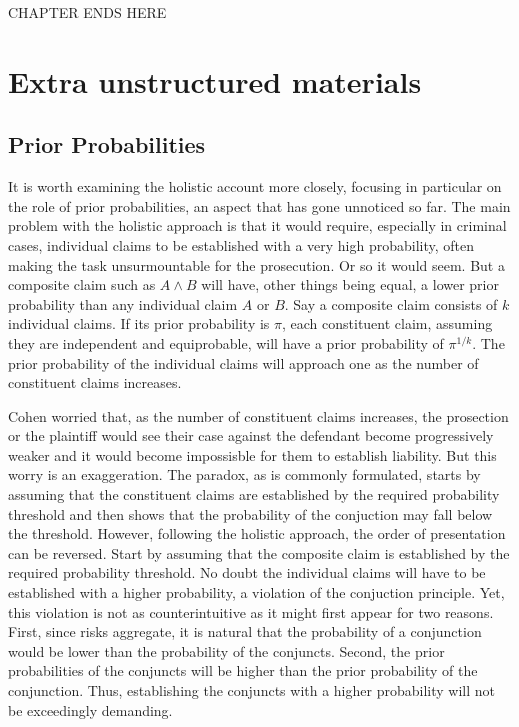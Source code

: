 \documentclass[
  10pt,
  dvipsnames,enabledeprecatedfontcommands]{scrartcl}
\begin{document}
CHAPTER ENDS HERE

\noindent\makebox[\linewidth]{\rule{\paperwidth}{1pt}}

\hypertarget{extra-unstructured-materials}{%
\section{Extra unstructured
materials}\label{extra-unstructured-materials}}

\hypertarget{prior-probabilities}{%
\subsection{Prior Probabilities}\label{prior-probabilities}}

It is worth examining the holistic account more closely, focusing in
particular on the role of prior probabilities, an aspect that has gone
unnoticed so far. The main problem with the holistic approach is that it
would require, especially in criminal cases, individual claims to be
established with a very high probability, often making the task
unsurmountable for the prosecution. Or so it would seem. But a composite
claim such as \(A\wedge B\) will have, other things being equal, a lower
prior probability than any individual claim \(A\) or \(B\). Say a
composite claim consists of \(k\) individual claims. If its prior
probability is \(\pi\), each constituent claim, assuming they are
independent and equiprobable, will have a prior probability of
\(\pi^{1/k}\). The prior probability of the individual claims will
approach one as the number of constituent claims increases.

Cohen worried that, as the number of constituent claims increases, the
prosection or the plaintiff would see their case against the defendant
become progressively weaker and it would become impossisble for them to
establish liability. But this worry is an exaggeration. The paradox, as
is commonly formulated, starts by assuming that the constituent claims
are established by the required probability threshold and then shows
that the probability of the conjuction may fall below the threshold.
However, following the holistic approach, the order of presentation can
be reversed. Start by assuming that the composite claim is established
by the required probability threshold. No doubt the individual claims
will have to be established with a higher probability, a violation of
the conjuction principle. Yet, this violation is not as counterintuitive
as it might first appear for two reasons. First, since risks aggregate,
it is natural that the probability of a conjunction would be lower than
the probability of the conjuncts. Second, the prior probabilities of the
conjuncts will be higher than the prior probability of the conjunction.
Thus, establishing the conjuncts with a higher probability will not be
exceedingly demanding.
\end{document}
